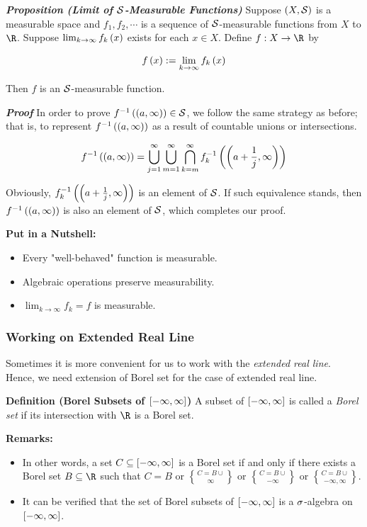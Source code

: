 \documentclass[
]{article}
\begin{document}
\emph{\textbf{Proposition (Limit of \(\S\)-Measurable Functions)}}
Suppose \(\pr{X,\S}\) is a measurable space and \(f_1,f_2,\cdots\) is a
sequence of \(\S\)-measurable functions from \(X\) to \(\R\). Suppose
\(\lim_{k\to \infty}f_k\pr x\) exists for each \(x\in X\). Define
\(f:X\to \R\) by

\[f\pr{x}: = \lim_{k\to\infty}f_k\pr{x}\]

Then \(f\) is an \(\S\)-measurable function.

\emph{\textbf{Proof}} In order to prove
\(\inv f\pr{\pr{a,\infty}}\in \S\), we follow the same strategy as
before; that is, to represent \(\inv f\pr{\pr{a,\infty}}\) as a result
of countable unions or intersections.

\[\inv f\pr{\pr{a,\infty}} = \uinf[j]\uinf[m]\bigcap_{k = m}^{\infty}f_k^{-1}\pr{\pr{a+\frac1j,\infty}}\]

Obviously, \(f_k^{-1}\pr{\pr{a+\frac1j,\infty}}\) is an element of
\(\S\). If such equivalence stands, then \(\inv f\pr{\pr{a,\infty}}\) is
also an element of \(\S\), which completes our proof.

\textbf{Put in a Nutshell:}

\begin{itemize}
\item
  Every "well-behaved" function is measurable.
\item
  Algebraic operations preserve measurability.
\item
  \(\lim_{k\to \infty}f_k = f\) is measurable.
\end{itemize}

\hypertarget{working-on-extended-real-line}{%
\subsubsection{Working on Extended Real
Line}\label{working-on-extended-real-line}}

Sometimes it is more convenient for us to work with the \emph{extended
real line}. Hence, we need extension of Borel set for the case of
extended real line.

\textbf{Definition (Borel Subsets of \(\br{-\infty,\infty}\))} A subset
of \(\br{-\infty,\infty}\) is called a \emph{Borel set} if its
intersection with \(\R\) is a Borel set.

\textbf{Remarks:}

\begin{itemize}
\item
  In other words, a set \(C\se \br{-\infty,\infty}\) is a Borel set if
  and only if there exists a Borel set \(B\se \R\) such that \(C = B\)
  or \(C = B\cup\brace{\infty}\) or \(C = B\cup\brace{-\infty}\) or
  \(C = B\cup\brace{-\infty,\infty}\).
\item
  It can be verified that the set of Borel subsets of
  \(\br{-\infty,\infty}\) is a \(\s\)-algebra on
  \(\br{-\infty,\infty}\).
\end{itemize}
\end{document}
